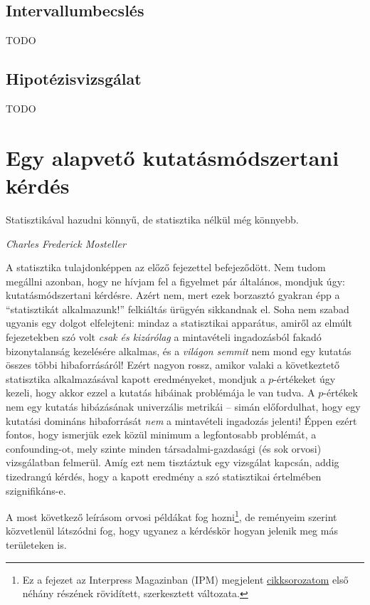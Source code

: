 \documentclass[magyar,]{book}
\let\rmarkdownfootnote\footnote%
\def\footnote{\protect\rmarkdownfootnote}
\begin{document}
\hypertarget{intervallumbecsluxe9s}{%
\section{Intervallumbecslés}\label{intervallumbecsluxe9s}}

TODO

\hypertarget{hipotuxe9zisvizsguxe1lat}{%
\section{Hipotézisvizsgálat}\label{hipotuxe9zisvizsguxe1lat}}

TODO

\hypertarget{egy-alapvetux151-kutatuxe1smuxf3dszertani-kuxe9rduxe9s}{%
\chapter{Egy alapvető kutatásmódszertani kérdés}\label{egy-alapvetux151-kutatuxe1smuxf3dszertani-kuxe9rduxe9s}}

\epigraph{Statisztikával hazudni könnyű, de statisztika nélkül még könnyebb.}{\textit{Charles Frederick Mosteller}}

A statisztika tulajdonképpen az előző fejezettel befejeződött. Nem tudom megállni azonban, hogy ne hívjam fel a figyelmet pár általános, mondjuk úgy: kutatásmódszertani kérdésre. Azért nem, mert ezek borzasztó gyakran épp a \enquote{statisztikát alkalmazunk!} felkiáltás ürügyén sikkandnak el. Soha nem szabad ugyanis egy dolgot elfelejteni: mindaz a statisztikai apparátus, amiről az elmúlt fejezetekben szó volt \emph{csak és kizárólag} a mintavételi ingadozásból fakadó bizonytalanság kezelésére alkalmas, és a \emph{világon semmit} nem mond egy kutatás összes többi hibaforrásáról! Ezért nagyon rossz, amikor valaki a következtető statisztika alkalmazásával kapott eredményeket, mondjuk a \(p\)-értékeket úgy kezeli, hogy akkor ezzel a kutatás hibáinak problémája le van tudva. A \(p\)-értékek nem egy kutatás hibázásának univerzális metrikái -- simán előfordulhat, hogy egy kutatási domináns hibaforrását \emph{nem} a mintavételi ingadozás jelenti! Éppen ezért fontos, hogy ismerjük ezek közül minimum a legfontosabb problémát, a confounding-ot, mely szinte minden társadalmi-gazdasági (és sok orvosi) vizsgálatban felmerül. Amíg ezt nem tisztáztuk egy vizsgálat kapcsán, addig tizedrangú kérdés, hogy a kapott eredmény a szó statisztikai értelmében szignifikáns-e.

A most következő leírásom orvosi példákat fog hozni\footnote{Ez a fejezet az Interpress Magazinban (IPM) megjelent \href{http://www.interpressmagazin.hu/cikkek/56732-az_orvoslas_tevedesei_1__resz}{cikksorozatom} első néhány részének rövidített, szerkesztett változata.}, de reményeim szerint közvetlenül látszódni fog, hogy ugyanez a kérdéskör hogyan jelenik meg más területeken is.
\end{document}
